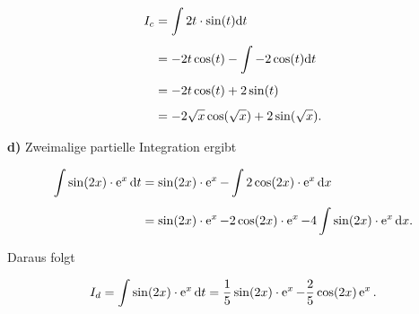 { \begin{equation*}
 \begin{aligned}
 I_c & = \int 2t \cdot \sin(t) \mathrm{d}  t\\[1ex]
 & = -2t \cos (t) - \int -2 \cos (t) \mathrm{d}  t \\[1ex]
 & = -2t \cos (t) + 2\sin(t) \\[1ex]
 & = -2 \sqrt{x} \cos (\sqrt{x}) + 2 \sin (\sqrt{x}).
 \end{aligned}
 \end{equation*}
\bigskip

\textbf{d)} Zweimalige partielle Integration ergibt
 
 \begin{equation*}
 \begin{aligned}
 \int \sin(2x) \cdot \operatorname{e}^x \mathrm{d}  t & = \sin(2x) \cdot \operatorname{e}^x - \int 2 \cos(2x) \cdot \operatorname{e}^x \mathrm{d}  x \\[1ex]
 & = \sin(2x) \cdot \operatorname{e}^x - 2 \cos(2x) \cdot \operatorname{e}^x - 4 \int \sin(2x) \cdot \operatorname{e}^x \mathrm{d}  x .
 \end{aligned}
 \end{equation*} 
 
 Daraus folgt
 
 \begin{equation*}
 I_d = \int \sin(2x) \cdot \operatorname{e}^x \mathrm{d}  t = \frac{1}{5} \sin(2x) \cdot \operatorname{e}^x - \frac{2}{5} \cos(2x) \operatorname{e}^x .
 \end{equation*}

}

% 
